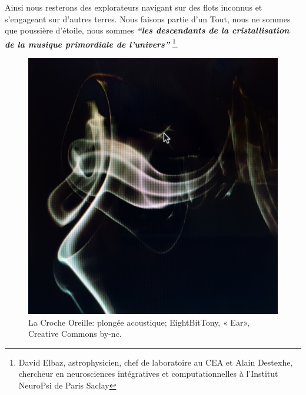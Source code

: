 Ainsi nous resterons des explorateurs navigant sur des flots inconnus et
s'engageant sur d'autres terres.
Nous faisons partie d'un Tout, nous ne sommes que poussière d'étoile,
nous sommes
\textit{\textbf{``les descendants de la  cristallisation de la musique primordiale de
l'univers''}} \autocite{delbaz_recherche_2016}\footnote{David Elbaz, astrophysicien, chef de laboratoire 
au CEA et Alain
Destexhe, chercheur en neurosciences intégratives et computationnelles
à l'Institut  NeuroPsi de Paris Saclay}.




      \begin{figure}[tbh]
        \centering
        \includegraphics[width=1\linewidth]{images/oreillephoto.jpg}
        \caption{La Croche Oreille: plongée acoustique; EightBitTony, « Ear», Creative Commons by-nc.}
        \label{fig}
      \end{figure}


